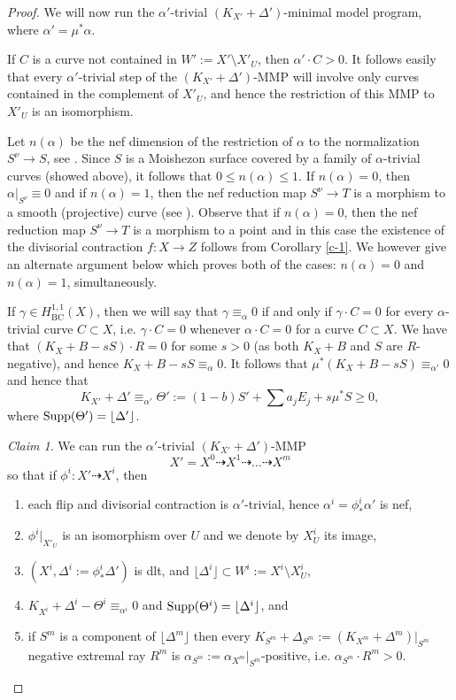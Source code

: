 \documentclass[12pt]{amsart}
\theoremstyle{plain}
\theoremstyle{remark}
\theoremstyle{definition}
\def\BC{\operatorname{BC}}
\newcommand{\<}{\leq}
\theoremstyle{definition}
\theoremstyle{definition}
\numberwithin{equation}{section}
\theoremstyle{remark}
\newtheorem{claim}[theorem]{Claim}
\begin{document}
\begin{proof}
We will now run the $\alpha'$-trivial $(K_{X'}+\Delta')$-minimal model program, where $\alpha '=\mu ^*\alpha$.

If $C$ is a curve not contained in $W':=X'\setminus X'_U$, then $\alpha'\cdot C>0$. It follows easily that every $\alpha' $-trivial step of the $(K_{X'}+\Delta ')$-MMP will involve only curves contained in the complement of $X'_U$, and hence the restriction of this MMP to $X'_U$ is an isomorphism. 

Let $n(\alpha )$ be the nef dimension of the restriction of $\alpha$ to the normalization $S^\nu\to S$, see \cite[Definition 2.7]{BCE02}. Since $S$ is a Moishezon surface covered by a family of $\alpha$-trivial curves (showed above), it follows that $0\leq n(\alpha )\leq 1$. If $n(\alpha )=0$, then $\alpha |_{S^\nu}\equiv 0$ and if $n(\alpha )=1$, then the nef reduction map $S^\nu \to T$ is a morphism to a smooth (projective) curve (see \cite[2.4.4]{BCE02}). Observe that if $n(\alpha )=0$, then the nef reduction map $S^\nu \to T$ is a morphism to a point and in this case the existence of the divisorial contraction $f:X\to Z $ follows from Corollary \ref{c-1}. We however give an alternate argument below which proves both of the cases: $n(\alpha)=0$ and $n(\alpha)=1$,  simultaneously. 


 If $\gamma\in H^{1,1}_{\BC}(X)$, then we will say that $\gamma\equiv_\alpha 0$ if and only if $\gamma\cdot C=0$ for every $\alpha$-trivial curve $C\subset X$, i.e. $\gamma\cdot C=0$ whenever $\alpha \cdot C=0$ for a curve $C\subset X$.
We  have that $(K_X+B-sS)\cdot R=0$ for some $s>0$ (as both $K_X+B$ and $S$ are $R$-negative), and hence $K_X+B-sS\equiv_\alpha 0$.
It follows that 
$\mu ^* (K_X+B-sS)\equiv _{\alpha'}0$ and hence that \[K_{X'}+\Delta'\equiv_{\alpha'} \Theta':=(1-b)S'+\sum a_jE_j+s\mu ^*S\geq 0,\] where %
${\rm Supp}(\Theta')=\lfloor \Delta '\rfloor$. 

\begin{claim}
    We can run the $\alpha '$-trivial $(K_{X'}+\Delta ')$-MMP 
    \[X'=X^0\dasharrow X^1 \dasharrow \ldots \dasharrow X^m\]
    so that if $\phi^i:X'\dasharrow X^i$, then
\begin{enumerate}
\item each flip and divisorial contraction is $\alpha'$-trivial, hence $\alpha ^i=\phi ^i_*\alpha'$ is nef,
\item  $\phi ^i|_{X'_U}$ is an isomorphism over $U$ and we denote by $X^i_U$ its image,
\item $(X^i,\Delta ^i:=\phi ^i_*\Delta ')$ is dlt, and $\lfloor \Delta ^i\rfloor \subset W^i:=X^i\setminus X^i_U$, 
\item $K_{X^i}+\Delta ^i-\Theta^i\equiv_{\alpha ^i} 0$ and ${\rm Supp}(\Theta^i)=\lfloor \Delta ^i\rfloor$, and
    \item if $S^m$ is a component of $\lfloor \Delta ^m\rfloor$ then every $K_{S^m}+\Delta _{S^m}:=(K_{X^m}+\Delta ^m)|_{S^m}$ negative extremal ray $R^m$ is $\alpha _{S^m}:=\alpha _{X^m}|_{S^m}$-positive, i.e. $\alpha _{S^m}\cdot R^m>0$.
\end{enumerate}
    

\end{claim}
\end{proof}
\end{document}
